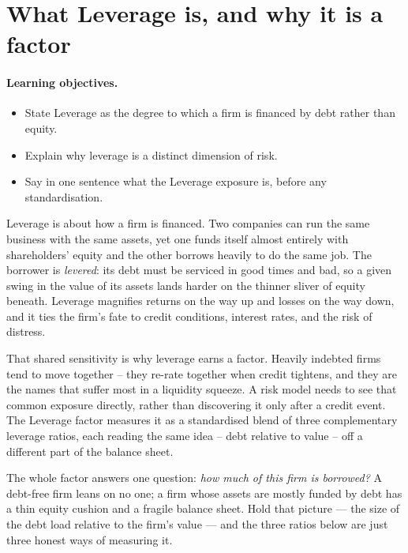 \documentclass[11pt]{article}
\theoremstyle{definition}
\theoremstyle{plain}
\theoremstyle{remark}
\begin{document}
\tableofcontents
\bigskip

\section{What Leverage is, and why it is a factor}\label{sec:what}

\paragraph{Learning objectives.}
\begin{itemize}[leftmargin=1.4em,topsep=2pt]
  \item State Leverage as the degree to which a firm is financed by debt rather than equity.
  \item Explain why leverage is a distinct dimension of risk.
  \item Say in one sentence what the Leverage exposure is, before any standardisation.
\end{itemize}

Leverage is about how a firm is financed. Two companies can run the same business with the same assets, yet one funds itself almost entirely with shareholders' equity and the other borrows heavily to do the same job. The borrower is \emph{levered}: its debt must be serviced in good times and bad, so a given swing in the value of its assets lands harder on the thinner sliver of equity beneath. Leverage magnifies returns on the way up and losses on the way down, and it ties the firm's fate to credit conditions, interest rates, and the risk of distress.

That shared sensitivity is why leverage earns a factor. Heavily indebted firms tend to move together -- they re-rate together when credit tightens, and they are the names that suffer most in a liquidity squeeze. A risk model needs to see that common exposure directly, rather than discovering it only after a credit event. The Leverage factor measures it as a standardised blend of three complementary leverage ratios, each reading the same idea -- debt relative to value -- off a different part of the balance sheet.

\begin{intuition}
The whole factor answers one question: \emph{how much of this firm is borrowed?} A debt-free firm leans on no one; a firm whose assets are mostly funded by debt has a thin equity cushion and a fragile balance sheet. Hold that picture --- the size of the debt load relative to the firm's value --- and the three ratios below are just three honest ways of measuring it.
\end{intuition}
\end{document}
